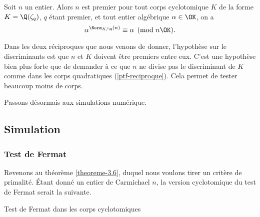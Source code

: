 \begin{theoreme}
	Soit $n$ un entier. Alors $n$ est premier \ssi pour tout corps cyclotomique $K$ de la forme $K = \Q(\zeta_q)$, $q$ étant premier, et tout entier algébrique $\alpha\in \OK$, on a $$\alpha^{\Norm_{K/\Q}(n)} \equiv \alpha \pmod{n\OK}.$$
\end{theoreme}

\begin{remarque}
	Dans les deux réciproques que nous venons de donner, l'hypothèse sur le discriminants est que $n$ et $K$ doivent être premiers entre eux. C'est une hypothèse bien plus forte que de demander à ce que $n$ ne divise pas le discriminant de $K$ comme dans les corps quadratiques (\ref{ptf-reciproque}). Cela permet de tester beaucoup moins de corps.
\end{remarque}

Passons désormais aux simulations numérique.

\subsection{Simulation}

\subsubsection{Test de Fermat}

Revenons au théorème \ref{theoreme-3.6}, duquel nous voulons tirer un critère de primalité. Étant donné un entier de Carmichael $n$, la version \og cyclotomique \fg{} du test de Fermat serait la suivante.

\vspace{1em}
\begin{algorithm}[H]\label{test-Fermat-cyclotomique}\label{algo-1}
\caption{Test de Fermat dans les corps cyclotomiques}
\end{algorithm}
\vspace{1em}

